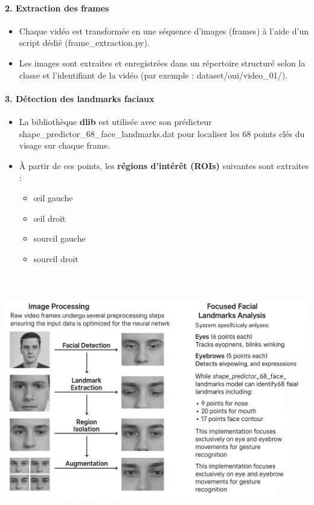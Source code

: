 \documentclass[
]{article}
\begin{document}
\hypertarget{extraction-des-frames}{%
\paragraph{\texorpdfstring{\textbf{2. Extraction des frames}}{2. Extraction des frames}}\label{extraction-des-frames}}

\begin{itemize}
\item
  Chaque vidéo est transformée en une séquence d'images (frames) à l'aide d'un script dédié (frame\_extraction.py).
\item
  Les images sont extraites et enregistrées dans un répertoire structuré selon la classe et l'identifiant de la vidéo (par exemple : dataset/oui/video\_01/).
\end{itemize}

\hypertarget{duxe9tection-des-landmarks-faciaux}{%
\paragraph{\texorpdfstring{\textbf{3. Détection des landmarks faciaux}}{3. Détection des landmarks faciaux}}\label{duxe9tection-des-landmarks-faciaux}}

\begin{itemize}
\item
  La bibliothèque \textbf{dlib} est utilisée avec son prédicteur shape\_predictor\_68\_face\_landmarks.dat pour localiser les 68 points clés du visage sur chaque frame.
\item
  À partir de ces points, les \textbf{régions d'intérêt (ROIs)} suivantes sont extraites :

  \begin{itemize}
  \item
    œil gauche
  \item
    œil droit
  \item
    sourcil gauche
  \item
    sourcil droit
  \end{itemize}
\end{itemize}

\includegraphics[width=6.5in,height=4.33333in]{c70417d1-281e-4e06-a2de-40679a02e3f7_media/media/image1.png}
\end{document}
